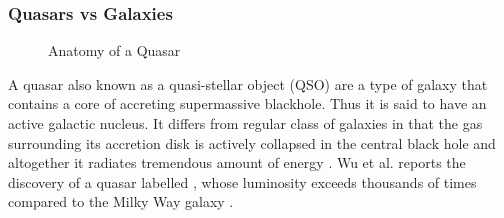 \subsubsection{Quasars vs Galaxies}
\begin{figure}
	\centering
	\caption{Anatomy of a Quasar} \parencite[Credit: ][]{nasa/goddard_space_flight_center_conceptual_image_lab_active_2008}
	\label{fig:agn}
\end{figure}
A quasar also known as a quasi-stellar object (QSO) are a type of galaxy that contains a core of accreting supermassive blackhole. Thus it is said to have an active galactic nucleus. It differs from regular class of galaxies in that the gas surrounding its accretion disk is actively collapsed in the central black hole and altogether it radiates tremendous amount of energy \parencite{nasa_active_2016}. Wu et al. reports the discovery of a quasar labelled , whose luminosity exceeds thousands of times compared to the Milky Way galaxy \parencite{wu_ultraluminous_2015}.

